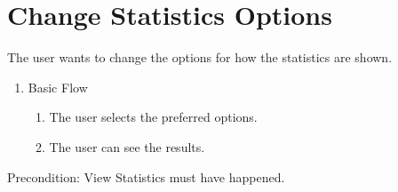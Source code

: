 \section{Change Statistics Options}
The user wants to change the options for how the statistics are shown.
\begin{enumerate}
  \item Basic Flow
  \begin{enumerate}
    \item The user selects the preferred options.
    \item The user can see the results.
  \end{enumerate}
\end{enumerate}
Precondition: \newline
View Statistics must have happened.